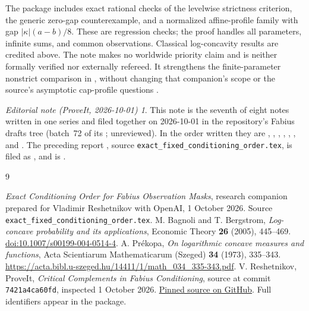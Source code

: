 \documentclass[11pt,a4paper]{article}
\theoremstyle{remark}\newtheorem*{ednote}{Editorial note (ProveIt, 2026-10-01)}
\begin{document}
The package includes exact rational checks of the levelwise strictness criterion, the generic zero-gap counterexample, and a normalized affine-profile family with gap $|\kappa|(a-b)/8$. These are regression checks; the proof handles all parameters, infinite sums, and common observations. Classical log-concavity results are credited above. The note makes no worldwide priority claim and is neither formally verified nor externally refereed. It strengthens the finite-parameter nonstrict comparison in \cite{Nonstrict}, without changing that companion's scope or the source's asymptotic cap-profile questions \cite{Repository}.
\begin{ednote}
This note is the seventh of eight notes written in one series and filed together on 2026-10-01 in the repository's Fabius drafts tree (batch~72 of its ; unreviewed). In the order written they are , , , , , ,  and . 
The preceding report \cite{Nonstrict}, source
\texttt{exact\_fixed\_conditioning\_order.tex}, is filed as
, and \cite{Repository} is
.
\end{ednote}

\begin{thebibliography}{9}\small\raggedright
\setlength{\itemsep}{3pt}\setlength{\parskip}{0pt}
 \emph{Exact Conditioning Order for Fabius Observation Masks}, research companion prepared for Vladimir Reshetnikov with OpenAI, 1 October 2026. Source \texttt{exact\_fixed\_conditioning\_order.tex}.
 M. Bagnoli and T. Bergstrom, \emph{Log-concave probability and its applications}, Economic Theory \textbf{26} (2005), 445--469. \href{https://doi.org/10.1007/s00199-004-0514-4}{doi:10.1007/s00199-004-0514-4}.
 A. Pr\'ekopa, \emph{On logarithmic concave measures and functions}, Acta Scientiarum Mathematicarum (Szeged) \textbf{34} (1973), 335--343. \url{https://acta.bibl.u-szeged.hu/14411/1/math_034_335-343.pdf}.
 V. Reshetnikov, ProveIt, \emph{Critical Complements in Fabius Conditioning}, source at commit \texttt{7421a4ca60fd}, inspected 1 October 2026. \href{https://github.com/VladimirReshetnikov/ProveIt/blob/7421a4ca60fdf125411edf412f825aac54278b37/Analysis/FabiusFunction/docs/semi-formalized-research-frontiers/drafts/representations/Critical_Complements_Sharp_Information_Loss/article.tex}{Pinned source on GitHub}. Full identifiers appear in the package.
\end{thebibliography}
\end{document}
